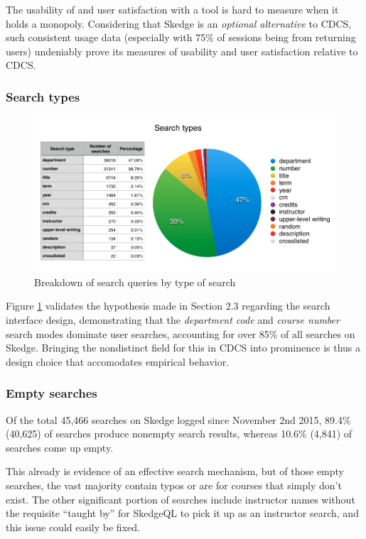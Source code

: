 The usability of and user satisfaction with a tool is hard to measure when it holds a monopoly. Considering that Skedge is an \emph{optional alternative} to CDCS, such consistent usage data (especially with 75\% of sessions being from returning users) undeniably prove its measures of usability and user satisfaction relative to CDCS.

  \subsubsection{Search types}

  \begin{figure}[H]
    \centering
    \includegraphics[width=1.0\textwidth]{images/graph/searchtypes}

    \caption{Breakdown of search queries by type of search}
    \label{fig:searchtypes}
  \end{figure}


Figure \ref{fig:searchtypes} validates the hypothesis made in Section 2.3 regarding the search interface design, demonstrating that the \emph{department code} and \emph{course number} search modes dominate user searches, accounting for over 85\% of all searches on Skedge. Bringing the nondistinct field for this in CDCS into prominence is thus a design choice that accomodates empirical behavior.

\subsubsection{Empty searches}

  Of the total 45,466 searches on Skedge logged since November 2nd 2015, 89.4\% (40,625) of searches produce nonempty search results, whereas 10.6\% (4,841) of searches come up empty.

  This already is evidence of an effective search mechanism, but of those empty searches, the vast majority contain typos or are for courses that simply don't exist. The other significant portion of searches include instructor names without the requisite ``taught by'' for SkedgeQL to pick it up as an instructor search, and this issue could easily be fixed.

